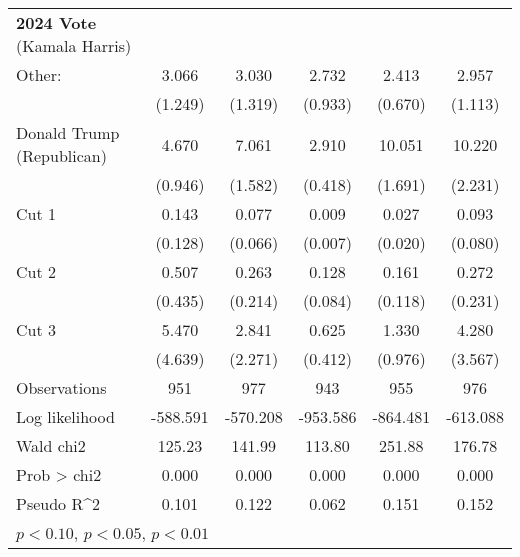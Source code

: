 \begin{table}[htbp]
\begin{tabular}{l*{5}{c}}
\textbf{2024 Vote} (Kamala Harris) &  &  &  &   & \\
Other:              &       3.066\sym{***}&       3.030\sym{**} &       2.732\sym{***}&       2.413\sym{***}&       2.957\sym{***}\\
                    &     (1.249)         &     (1.319)         &     (0.933)         &     (0.670)         &     (1.113)         \\

Donald Trump (Republican)&       4.670\sym{***}&       7.061\sym{***}&       2.910\sym{***}&      10.051\sym{***}&      10.220\sym{***}\\
                    &     (0.946)         &     (1.582)         &     (0.418)         &     (1.691)         &     (2.231)         \\
Cut 1               &       0.143\sym{**} &       0.077\sym{***}&       0.009\sym{***}&       0.027\sym{***}&       0.093\sym{***}\\
                    &     (0.128)         &     (0.066)         &     (0.007)         &     (0.020)         &     (0.080)         \\
Cut 2               &       0.507         &       0.263         &       0.128\sym{***}&       0.161\sym{**} &       0.272         \\
                    &     (0.435)         &     (0.214)         &     (0.084)         &     (0.118)         &     (0.231)         \\
Cut 3               &       5.470\sym{**} &       2.841         &       0.625         &       1.330         &       4.280\sym{*}  \\
                    &     (4.639)         &     (2.271)         &     (0.412)         &     (0.976)         &     (3.567)         \\
\hline
Observations        &         951         &         977         &         943         &         955         &         976         \\
Log likelihood      &    -588.591         &    -570.208         &    -953.586         &    -864.481         &    -613.088         \\
Wald chi2           &      125.23         &      141.99         &      113.80         &      251.88         &      176.78         \\
Prob > chi2         &       0.000         &       0.000         &       0.000         &       0.000         &       0.000         \\
Pseudo R^2          &       0.101         &       0.122         &       0.062         &       0.151         &       0.152         \\
\hline\hline
\multicolumn{7}{l}{\footnotesize \sym{*} \(p<0.10\), \sym{**} \(p<0.05\), \sym{***} \(p<0.01\)}\\


\end{tabular}
\end{table}
